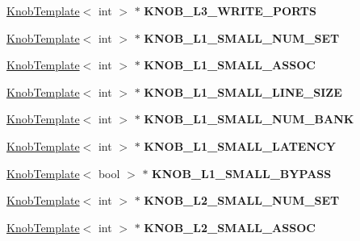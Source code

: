 \begin{DoxyCompactItemize}
\item 
\hypertarget{classall__knobs__c_afa18ee9c35b25e1e2021885394cd6ae3}{
\hyperlink{classKnobTemplate}{KnobTemplate}$<$ int $>$ $\ast$ {\bfseries KNOB\_\-L3\_\-WRITE\_\-PORTS}}
\label{classall__knobs__c_afa18ee9c35b25e1e2021885394cd6ae3}

\item 
\hypertarget{classall__knobs__c_a68afd29dc7782b742a58d1436876d4a5}{
\hyperlink{classKnobTemplate}{KnobTemplate}$<$ int $>$ $\ast$ {\bfseries KNOB\_\-L1\_\-SMALL\_\-NUM\_\-SET}}
\label{classall__knobs__c_a68afd29dc7782b742a58d1436876d4a5}

\item 
\hypertarget{classall__knobs__c_ac61275432738b3217f29532c7ff84680}{
\hyperlink{classKnobTemplate}{KnobTemplate}$<$ int $>$ $\ast$ {\bfseries KNOB\_\-L1\_\-SMALL\_\-ASSOC}}
\label{classall__knobs__c_ac61275432738b3217f29532c7ff84680}

\item 
\hypertarget{classall__knobs__c_a765fd3e6b5d9e45b4bacd94ec8bdb4f7}{
\hyperlink{classKnobTemplate}{KnobTemplate}$<$ int $>$ $\ast$ {\bfseries KNOB\_\-L1\_\-SMALL\_\-LINE\_\-SIZE}}
\label{classall__knobs__c_a765fd3e6b5d9e45b4bacd94ec8bdb4f7}

\item 
\hypertarget{classall__knobs__c_a7cf380be11ef782b0b09fb81f0078f4a}{
\hyperlink{classKnobTemplate}{KnobTemplate}$<$ int $>$ $\ast$ {\bfseries KNOB\_\-L1\_\-SMALL\_\-NUM\_\-BANK}}
\label{classall__knobs__c_a7cf380be11ef782b0b09fb81f0078f4a}

\item 
\hypertarget{classall__knobs__c_a56a0805181eaf9c559dc5e8d99903bca}{
\hyperlink{classKnobTemplate}{KnobTemplate}$<$ int $>$ $\ast$ {\bfseries KNOB\_\-L1\_\-SMALL\_\-LATENCY}}
\label{classall__knobs__c_a56a0805181eaf9c559dc5e8d99903bca}

\item 
\hypertarget{classall__knobs__c_a62180267c3775be0bd616736c2299502}{
\hyperlink{classKnobTemplate}{KnobTemplate}$<$ bool $>$ $\ast$ {\bfseries KNOB\_\-L1\_\-SMALL\_\-BYPASS}}
\label{classall__knobs__c_a62180267c3775be0bd616736c2299502}

\item 
\hypertarget{classall__knobs__c_a4d3635e0f9ec874d2d0aae47e9594cc4}{
\hyperlink{classKnobTemplate}{KnobTemplate}$<$ int $>$ $\ast$ {\bfseries KNOB\_\-L2\_\-SMALL\_\-NUM\_\-SET}}
\label{classall__knobs__c_a4d3635e0f9ec874d2d0aae47e9594cc4}

\item 
\hypertarget{classall__knobs__c_a9e2eaac2095be73d28206d1c9c37ce68}{
\hyperlink{classKnobTemplate}{KnobTemplate}$<$ int $>$ $\ast$ {\bfseries KNOB\_\-L2\_\-SMALL\_\-ASSOC}}
\label{classall__knobs__c_a9e2eaac2095be73d28206d1c9c37ce68}


\end{DoxyCompactItemize}
